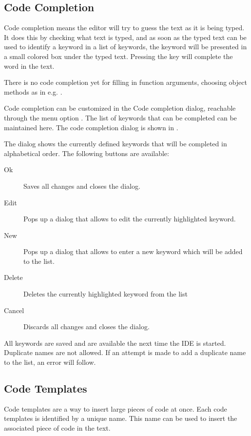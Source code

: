 \subsection{Code Completion}
\label{se:codecompletion}
Code completion means the editor will try to guess the text as it
is being typed. It does this by checking what text is typed, and as soon
as the typed text can be used to identify a keyword in a list of keywords,
the keyword will be presented in a small colored box under the typed text.
Pressing the  key will complete the word in the text.

There is no code completion yet for filling in function arguments, choosing
object methods as in e.g. \delphi.

Code completion can be customized in the Code completion dialog, reachable
through the menu option .
The list of keywords that can be completed can be maintained here.
The code completion dialog is shown in .


The dialog shows the currently defined keywords that will be completed in
alphabetical order.
The following buttons are available:
\begin{description}
\item[Ok] Saves all changes and closes the dialog.
\item[Edit] Pops up a dialog that allows to edit the currently
highlighted keyword.
\item[New] Pops up a dialog that allows to enter a new keyword which will be
added to the list.
\item[Delete] Deletes the currently highlighted keyword from the list
\item[Cancel] Discards all changes and closes the dialog.
\end{description}
All keywords are saved and are available the next time the IDE is started.
Duplicate names are not allowed. If an attempt is made to add a duplicate
name to the list, an error will follow.

\subsection{Code Templates}
Code templates are a way to insert large pieces of code at once. Each
code templates is identified by a unique name. This name can be used to
insert the associated piece of code in the text.

